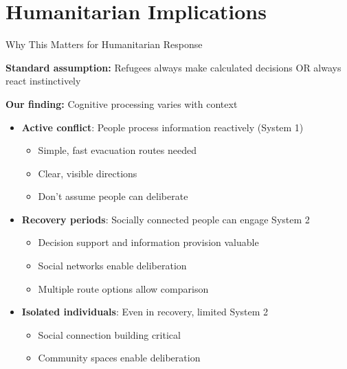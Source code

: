 \documentclass[aspectratio=169]{beamer}
\begin{document}
\section{Humanitarian Implications}

\begin{frame}{Why This Matters for Humanitarian Response}

\textbf{Standard assumption:} Refugees always make calculated decisions OR always react instinctively

\vspace{1em}

\textbf{Our finding:} Cognitive processing varies with context

\begin{itemize}
    \item \textbf{Active conflict}: People process information reactively (System 1)
    \begin{itemize}
        \item Simple, fast evacuation routes needed
        \item Clear, visible directions
        \item Don't assume people can deliberate
    \end{itemize}
    \item \textbf{Recovery periods}: Socially connected people can engage System 2
    \begin{itemize}
        \item Decision support and information provision valuable
        \item Social networks enable deliberation
        \item Multiple route options allow comparison
    \end{itemize}
    \item \textbf{Isolated individuals}: Even in recovery, limited System 2
    \begin{itemize}
        \item Social connection building critical
        \item Community spaces enable deliberation
    \end{itemize}
\end{itemize}

\end{frame}
\end{document}
